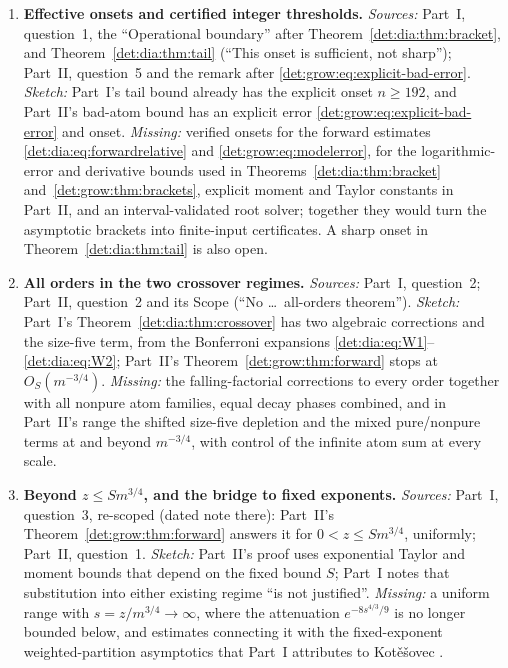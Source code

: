 \documentclass[11pt,letterpaper]{article}
\numberwithin{equation}{section}
\theoremstyle{definition}\newtheorem{definition}[theorem]{Definition}
\theoremstyle{remark}\newtheorem{remark}[theorem]{Remark}
\begin{document}
\begin{enumerate}
\item\label{det:q:effective} \textbf{Effective onsets and certified integer thresholds.} \emph{Sources:} Part~I, question~1, the ``Operational boundary'' after Theorem~\ref{det:dia:thm:bracket}, and Theorem~\ref{det:dia:thm:tail} (``This onset is sufficient, not sharp''); Part~II, question~5 and the remark after \eqref{det:grow:eq:explicit-bad-error}. \emph{Sketch:} Part~I's tail bound already has the explicit onset $n\ge192$, and Part~II's bad-atom bound has an explicit error \eqref{det:grow:eq:explicit-bad-error} and onset. \emph{Missing:} verified onsets for the forward estimates \eqref{det:dia:eq:forwardrelative} and \eqref{det:grow:eq:modelerror}, for the logarithmic-error and derivative bounds used in Theorems~\ref{det:dia:thm:bracket} and~\ref{det:grow:thm:brackets}, explicit moment and Taylor constants in Part~II, and an interval-validated root solver; together they would turn the asymptotic brackets into finite-input certificates. A sharp onset in Theorem~\ref{det:dia:thm:tail} is also open.
\item\label{det:q:allorders} \textbf{All orders in the two crossover regimes.} \emph{Sources:} Part~I, question~2; Part~II, question~2 and its Scope (``No \dots\ all-orders theorem''). \emph{Sketch:} Part~I's Theorem~\ref{det:dia:thm:crossover} has two algebraic corrections and the size-five term, from the Bonferroni expansions \eqref{det:dia:eq:W1}--\eqref{det:dia:eq:W2}; Part~II's Theorem~\ref{det:grow:thm:forward} stops at $O_S(m^{-3/4})$. \emph{Missing:} the falling-factorial corrections to every order together with all nonpure atom families, equal decay phases combined, and in Part~II's range the shifted size-five depletion and the mixed pure/nonpure terms at and beyond $m^{-3/4}$, with control of the infinite atom sum at every scale.
\item\label{det:q:growing} \textbf{Beyond $z\le Sm^{3/4}$, and the bridge to fixed exponents.} \emph{Sources:} Part~I, question~3, re-scoped (dated note there): Part~II's Theorem~\ref{det:grow:thm:forward} answers it for $0<z\le Sm^{3/4}$, uniformly; Part~II, question~1. \emph{Sketch:} Part~II's proof uses exponential Taylor and moment bounds that depend on the fixed bound $S$; Part~I notes that substitution into either existing regime ``is not justified''. \emph{Missing:} a uniform range with $s=z/m^{3/4}\to\infty$, where the attenuation $e^{-8s^{4/3}/9}$ is no longer bounded below, and estimates connecting it with the fixed-exponent weighted-partition asymptotics that Part~I attributes to Kot\v{e}\v{s}ovec \cite{kotesovec}.

\end{enumerate}
\end{document}
